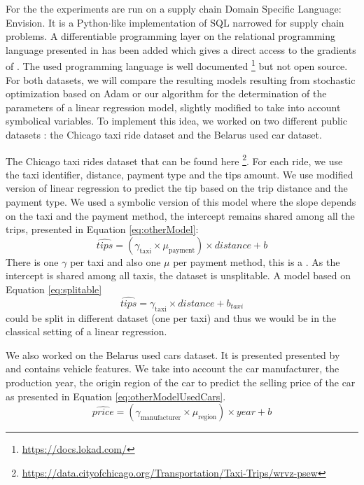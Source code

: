 For the \catmod the experiments are run on a supply chain Domain Specific Language: Envision. It is a Python$\cdot$like implementation of SQL narrowed for supply chain problems. A differentiable programming layer on the relational programming language presented in \cite{Peseux2021DifferentiatingRQ} has been added which gives a direct access to the gradients of \catmod. The used programming language is well documented \footnote{\url{https://docs.lokad.com/}} but not open source. %
For both datasets, we will compare the resulting models resulting from stochastic optimization based on Adam or our algorithm for the determination of the parameters of a linear regression model, slightly modified to take into account symbolical variables. To implement this idea, we worked on two different public datasets : the Chicago taxi ride dataset and the Belarus used car dataset.

The Chicago taxi rides dataset that can be found here \footnote{\url{https://data.cityofchicago.org/Transportation/Taxi-Trips/wrvz-psew}}. 
For each ride, we use the taxi identifier, distance, payment type and the tips amount. We use modified version of linear regression to predict the tip based on the trip distance and the payment type. We used a symbolic version of this model where the slope depends on the taxi and the payment method, the intercept remains shared among all the trips, presented in Equation \ref{eq:otherModel}:
\begin{equation*}\label{eq:otherModel}
    \hat{tips} = (\gamma_{\text{taxi}} \times \mu_{\text{payment}}) \times distance + b 
\end{equation*}
There is one $\gamma$ per taxi and also one $\mu$ per payment method, this is a \catmod. As the intercept is shared among all taxis, the dataset is unsplitable. A model based on Equation \ref{eq:splitable}
\begin{equation}\label{eq:splitable}
\hat{tips} = \gamma_{\text{taxi}}  \times distance + b_{taxi}
\end{equation}
could be split in different dataset (one per taxi) and thus we would be in the classical setting of a linear regression.



We also worked on the Belarus used cars dataset. It is presented presented by \cite{UsedCars} and contains vehicle features. We take into account the car manufacturer, the production year, the origin region of the car to predict the selling price of the car as presented in Equation \ref{eq:otherModelUsedCars}.
\begin{equation*}\label{eq:otherModelUsedCars}
    \hat{price} = (\gamma_{\text{manufacturer}} \times \mu_{\text{region}}) \times year + b 
\end{equation*}

